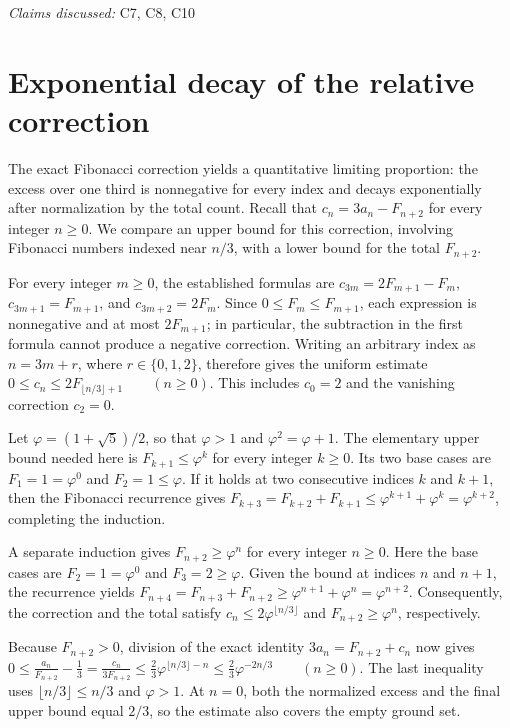 \documentclass[11pt]{article}
\begin{document}
\textit{Claims discussed: }C7, C8, C10
\section{Exponential decay of the relative correction}
The exact Fibonacci correction yields a quantitative limiting proportion: the excess over one third is nonnegative for every index and decays exponentially after normalization by the total count. Recall that $c_n=3a_n-F_{n+2}$ for every integer $n\geq 0$. We compare an upper bound for this correction, involving Fibonacci numbers indexed near $n/3$, with a lower bound for the total $F_{n+2}$.

For every integer $m\geq 0$, the established formulas are $c_{3m}=2F_{m+1}-F_m$, $c_{3m+1}=F_{m+1}$, and $c_{3m+2}=2F_m$. Since $0\leq F_m\leq F_{m+1}$, each expression is nonnegative and at most $2F_{m+1}$; in particular, the subtraction in the first formula cannot produce a negative correction. Writing an arbitrary index as $n=3m+r$, where $r\in\{0,1,2\}$, therefore gives the uniform estimate
$0\leq c_n\leq 2F_{\lfloor n/3\rfloor+1}\qquad(n\geq 0).$
This includes $c_0=2$ and the vanishing correction $c_2=0$.

Let $\varphi=(1+\sqrt{5})/2$, so that $\varphi>1$ and $\varphi^2=\varphi+1$. The elementary upper bound needed here is $F_{k+1}\leq\varphi^k$ for every integer $k\geq 0$. Its two base cases are $F_1=1=\varphi^0$ and $F_2=1\leq\varphi$. If it holds at two consecutive indices $k$ and $k+1$, then the Fibonacci recurrence gives $F_{k+3}=F_{k+2}+F_{k+1}\leq\varphi^{k+1}+\varphi^k=\varphi^{k+2}$, completing the induction.

A separate induction gives $F_{n+2}\geq\varphi^n$ for every integer $n\geq 0$. Here the base cases are $F_2=1=\varphi^0$ and $F_3=2\geq\varphi$. Given the bound at indices $n$ and $n+1$, the recurrence yields $F_{n+4}=F_{n+3}+F_{n+2}\geq\varphi^{n+1}+\varphi^n=\varphi^{n+2}$. Consequently, the correction and the total satisfy $c_n\leq 2\varphi^{\lfloor n/3\rfloor}$ and $F_{n+2}\geq\varphi^n$, respectively.

Because $F_{n+2}>0$, division of the exact identity $3a_n=F_{n+2}+c_n$ now gives
$0\leq\frac{a_n}{F_{n+2}}-\frac13=\frac{c_n}{3F_{n+2}}\leq\frac23\varphi^{\lfloor n/3\rfloor-n}\leq\frac23\varphi^{-2n/3}\qquad(n\geq 0).$
The last inequality uses $\lfloor n/3\rfloor\leq n/3$ and $\varphi>1$. At $n=0$, both the normalized excess and the final upper bound equal $2/3$, so the estimate also covers the empty ground set.
\end{document}
